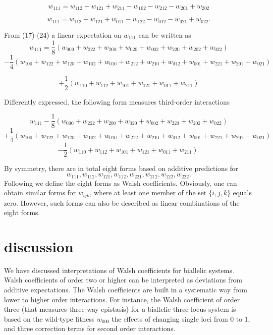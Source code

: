 \documentclass[12pt]{amsart}
\theoremstyle{plain}
\theoremstyle{definition}
\begin{document}
\begin{equation}
w_{111}=w_{112}+w_{121}+w_{211}-w_{102}-w_{212}-w_{201}+w_{202}
\end{equation}



\begin{equation}
w_{111}=w_{112}+w_{121}+w_{011}-w_{122}-w_{012}-w_{021}+w_{022}.
\end{equation}




From (17)-(24) a linear expectation on $w_{111}$ can be written as
\medskip
\[
w_{111}=\frac{1}{8}(w_{000}+w_{222}+w_{200}+w_{020}+w_{002}+w_{220}+w_{202}+w_{022}) 
\]
\[
-\frac{1}{4}(w_{100}+w_{122}+w_{120}+w_{102}+ w_{010}+w_{212}+w_{210}+w_{012}+w_{001}+w_{221}+w_{201}+w_{021}) 
\]

\[
+ \frac{1}{2}(w_{110}+w_{112}+w_{101}+w_{121}+ w_{011}+w_{211}) 
\]


Differently expressed, the following form measures third-order interactions

\[
w_{111}-\frac{1}{8}(w_{000}+w_{222}+w_{200}+w_{020}+w_{002}+w_{220}+w_{202}+w_{022}) 
\]
\[
+ \frac{1}{4}(w_{100}+w_{122}+w_{120}+w_{102}+ w_{010}+w_{212}+w_{210}+w_{012}+w_{001}+w_{221}+w_{201}+w_{021}) 
\]
\[
-\frac{1}{2}(w_{110}+w_{112}+w_{101}+w_{121}+ w_{011}+w_{211}).
\]





By symmetry, there are in total eight forms based on additive predictions
for 
\[
w_{111}, w_{112}, w_{121}, w_{112}, w_{221}, w_{212},w_{122}, w_{222}.
\]
Following \citet{gs} we define the eight forms as Walsh coefficients.
Obviously, one can obtain similar forms for $w_{ijk}$, where at least one member of 
the set $\{ i, j, k \}$ equals zero. However, such forms can also be described as linear combinations 
of the eight forms. 





\section{discussion}
We have discussed interpretations of Walsh coefficients for biallelic systems.
Walsh coefficients of order two or higher can be interpreted as deviations
from additive expectations. 
The Walsh coefficients are built in a systematic way
from lower to higher order interactions. 
For instance, the Walsh coefficient of order three 
 (that measures three-way epistasis) for a biallelic three-locus system
is  based on the wild-type fitness $w_{000}$
the effects of changing single loci from 0 to 1, and 
three correction terms for second order
interactions. 
\end{document}

